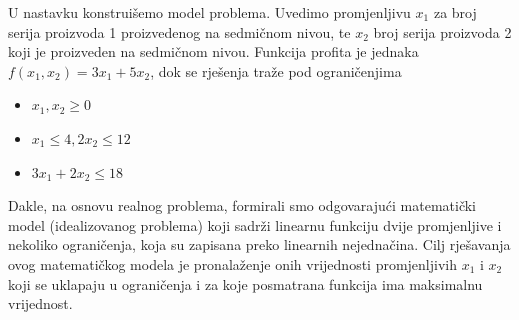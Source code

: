 \documentclass[a4paper, utf8, 11pt, colorlinks]{book}
\theoremstyle{definition}
\begin{document}
\begin{table}[!ht]
    \centering
    \caption{Procjene konstanti modela.}
    \label{tab:procjene-1}
\end{table}

U nastavku konstruišemo model problema. Uvedimo promjenljivu $x_1$ za broj serija proizvoda 1 proizvedenog na sedmičnom nivou, te $x_2$ broj serija proizvoda 2 koji je proizveden na sedmičnom nivou. Funkcija profita je jednaka $f(x_1, x_2) = 3 x_1 + 5 x_2$, dok se rješenja traže pod ograničenjima
\begin{itemize}
    \item $x_1, x_2 \geq 0$
    \item  $x_1 \leq 4, 2 x_2 \leq 12$
    \item $3 x_1 + 2 x_2 \leq 18$
\end{itemize}

Dakle, na osnovu realnog problema, formirali smo odgovarajući matematički model (idealizovanog problema) koji sadrži  linearnu funkciju dvije promjenljive i nekoliko ograničenja, koja su zapisana preko linearnih nejednačina. Cilj rješavanja ovog matematičkog modela je pronalaženje onih vrijednosti promjenljivih $x_1$ i $x_2$ koji se uklapaju u ograničenja i za koje posmatrana funkcija ima maksimalnu vrijednost.

\end{document}
